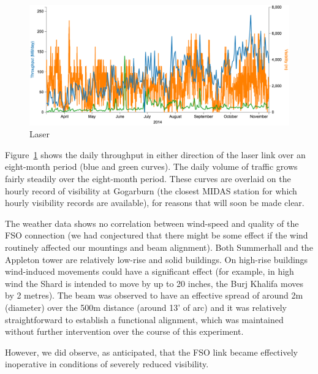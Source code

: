 \documentclass{amsart}
\begin{document}
\begin{figure}
  \centering
  \includegraphics[width=\textwidth]{results/fig1-Laser-12-Apr-12-Nov}
  \caption{Laser}
  \label{fig:throughput_laser}
\end{figure}
Figure~\ref{fig:throughput_laser} shows the daily throughput in either
direction of the laser link over an eight-month period (blue and green
curves). The daily volume of traffic grows fairly steadily over the
eight-month period. These curves are overlaid on the hourly record of
visibility at Gogarburn (the closest MIDAS station for which hourly
visibility records are available), for reasons that will soon be made
clear.

The weather data shows no correlation between wind-speed and quality
of the FSO connection (we had conjectured that there might be some
effect if the wind routinely affected our mountings and beam alignment). Both
Summerhall and the Appleton tower are relatively low-rise
and solid buildings. On high-rise buildings wind-induced movements
could have a significant effect (for example, in high wind the Shard
is intended to move by up to 20 inches, the Burj Khalifa moves by 2 metres). The beam
was observed to have an effective
spread of around 2m (diameter) over the 500m distance (around 13’ of
arc) and it was relatively straightforward to establish a functional
alignment, which was maintained without further intervention over the
course of this experiment. 

However, we did observe, as anticipated,
that the FSO link became effectively inoperative in conditions of
severely reduced visibility.
\end{document}
